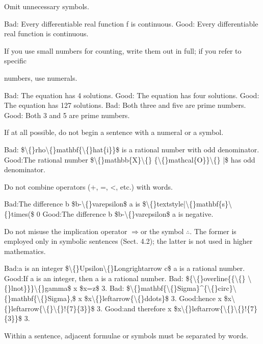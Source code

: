 \documentclass[11pt]{article}
\theoremstyle{plain}
\theoremstyle{definition}
\begin{document}
\textbullet{} Omit unnecessary symbols.

Bad: Every differentiable real function f is continuous. Good: Every differentiable real function is continuous.

\textbullet{} If you use small numbers for counting, write them out in full; if you refer to specific

numbers, use numerals.

Bad: The equation has 4 solutions. Good: The equation has four solutions. Good: The equation has 127 solutions. Bad: Both three and five are prime numbers. Good: Both 3 and 5 are prime numbers.

\textbullet{} If at all possible, do not begin a sentence with a numeral or a symbol.

Bad: \$\textbackslash\{\}rho\textbackslash\{\}mathbf\{\textbackslash\{\}hat\{i\}\}\$ is a rational number with odd denominator. Good:The rational number \$\textbackslash\{\}mathbb\{X\}\textbackslash\{\} \{\textbackslash\{\}mathcal\{O\}\}\textbackslash\{\} |\$ has odd denominator.

\textbullet{} Do not combine operators (+, =, <, etc.) with words.

Bad:The difference b \$b-\textbackslash\{\}varepsilon\$ a is \$\textbackslash\{\}textstyle|\textbackslash\{\}mathbf\{s\}\textbackslash\{\}times(\$ 0 Good:The difference b \$b-\textbackslash\{\}varepsilon\$ a is negative.

\textbullet{} Do not misuse the implication operator $\Rightarrow$or the symbol $\therefore$. The former is employed only in symbolic sentences (Sect. 4.2); the latter is not used in higher mathematics.

Bad:a is an integer \$\textbackslash\{\}Upsilon\textbackslash\{\}Longrightarrow c\$ a is a rational number. Good:If a is an integer, then a is a rational number. Bad: \$\{\textbackslash\{\}overline\{\{\textbackslash\{\} \textbackslash\{\}lnot\}\}\}\textbackslash\{\}gamma\$ x \$x=z\$ 3. Bad: \$\textbackslash\{\}mathbf\{\textbackslash\{\}Sigma\}\textasciicircum{}\{\textbackslash\{\}circ\}\textbackslash\{\}mathbf\{\textbackslash\{\}Sigma\},\$ x \$x\textbackslash\{\}leftarrow\{\textbackslash\{\}ddots\}\$ 3. Good:hence x \$x\textbackslash\{\}leftarrow\{\textbackslash\{\}\textbackslash\{\}!\{7\}\{3\}\}\$ 3. Good:and therefore x \$x\textbackslash\{\}leftarrow\{\textbackslash\{\}\textbackslash\{\}!\{7\}\{3\}\}\$ 3.

\textbullet{} Within a sentence, adjacent formulae or symbols must be separated by words.
\end{document}
